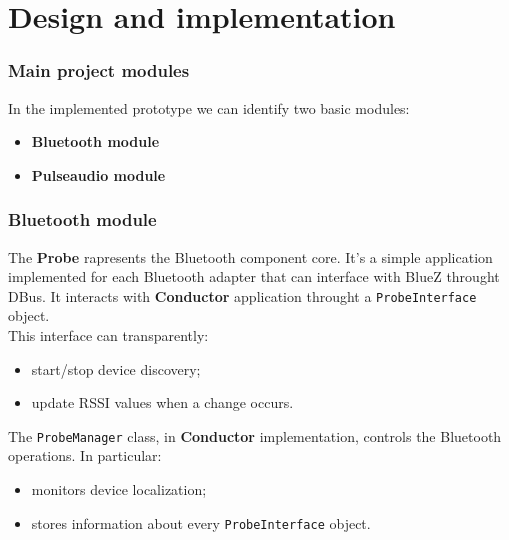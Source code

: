 \documentclass{beamer}
\begin{document}
\section{Design and implementation}

	\begin{frame}
	\frametitle{Main project modules}
		In the implemented prototype we can identify two basic modules:
		\begin{itemize}
		\item \textbf{Bluetooth module}
		\item \textbf{Pulseaudio module}
		\end{itemize}
	\end{frame}

	\begin{frame}
		\frametitle{Bluetooth module}
		The \textbf{Probe} rapresents the Bluetooth component core. It's a simple application implemented for each Bluetooth adapter that can interface with BlueZ throught DBus. It interacts with \textbf{Conductor} application throught a \texttt{ProbeInterface} object.\\ This interface can transparently: 
		\begin{itemize}
		\item start/stop device discovery;
		\item update RSSI values when a change occurs.
		\end{itemize}
		\vspace{0.5cm}
		The \texttt{ProbeManager} class, in \textbf{Conductor} implementation, controls the Bluetooth operations. In particular:
		\begin{itemize}
		\item monitors device localization;
		\item stores information about every \texttt{ProbeInterface} object.
		\end{itemize}
	
	\end{frame}
	
\end{document}
